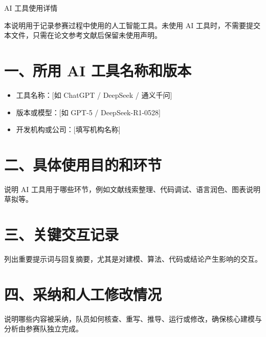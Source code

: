 \thispagestyle{plain}

\begin{center}
  {\heiti{} AI 工具使用详情}
\end{center}

\vspace{1em}

\noindent 本说明用于记录参赛过程中使用的人工智能工具。未使用 AI 工具时，不需要提交本文件，只需在论文参考文献后保留未使用声明。

\vspace{0.8em}

\section*{一、所用 AI 工具名称和版本}

\begin{itemize}[leftmargin=2em]
  \item 工具名称：[如 ChatGPT / DeepSeek / 通义千问]
  \item 版本或模型：[如 GPT-5 / DeepSeek-R1-0528]
  \item 开发机构或公司：[填写机构名称]
\end{itemize}

\section*{二、具体使用目的和环节}

说明 AI 工具用于哪些环节，例如文献线索整理、代码调试、语言润色、图表说明草拟等。

\section*{三、关键交互记录}

列出重要提示词与回复摘要，尤其是对建模、算法、代码或结论产生影响的交互。

\section*{四、采纳和人工修改情况}

说明哪些内容被采纳，队员如何核查、重写、推导、运行或修改，确保核心建模与分析由参赛队独立完成。
